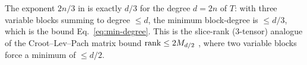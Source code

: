 \begin{remark}\label{rem:threshold}
The exponent $2n/3$ in  is exactly $d/3$ for the degree
$d=2n$ of $T$: with three variable blocks summing to degree $\le d$, the minimum
block-degree is $\le d/3$, which is the bound Eq.~\eqref{eq:min-degree}. This is the
slice-rank ($3$-tensor) analogue of the Croot–Lev–Pach matrix bound
$\operatorname{rank}\le 2M_{d/2}$ \cite{crootlevpach2017}, where two variable blocks force a
minimum of $\le d/2$.
\end{remark}

